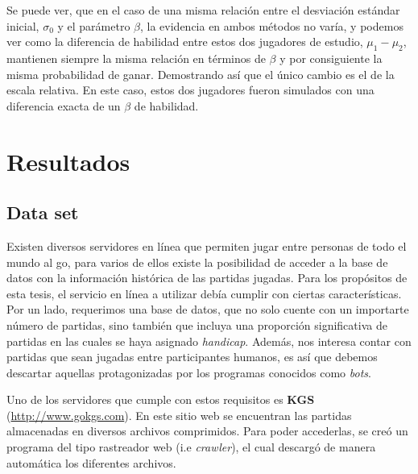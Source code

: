 \documentclass[11pt,twoside,spanish]{report} %
\begin{document}
Se puede ver, que en el caso de una misma relaci\'on entre el desviaci\'on est\'andar inicial, $\sigma_0$ y el par\'ametro $\beta$, la evidencia en ambos m\'etodos  no var\'ia, y podemos ver como la diferencia de habilidad entre estos dos jugadores de estudio,  $\mu_1-\mu_2$, mantienen siempre la misma relaci\'on en t\'erminos de $\beta$ y por consiguiente la misma probabilidad de ganar.
Demostrando as\'i que el \'unico cambio es el de la escala relativa.
En este caso, estos dos jugadores fueron simulados con una diferencia exacta de un $\beta$ de habilidad.











\chapter{Resultados}

\section{Data set}


Existen diversos servidores en l\'inea que permiten jugar entre personas de todo el mundo al go, para varios de ellos existe la posibilidad de acceder a la base de datos con la informaci\'on hist\'orica de las partidas jugadas.
Para los prop\'ositos de esta tesis, el servicio en l\'inea a utilizar deb\'ia cumplir con ciertas caracter\'isticas.
Por un lado, requerimos una base de datos, que no solo cuente con un importarte n\'umero de partidas, sino tambi\'en que incluya una proporci\'on significativa de partidas en las cuales se haya asignado \textit{handicap}.
Adem\'as, nos interesa contar con partidas que sean jugadas entre participantes humanos, es as\'i que debemos descartar aquellas protagonizadas por los programas conocidos como \textit{bots}.

Uno de los servidores que cumple con estos requisitos es \textbf{KGS} (\url{http://www.gokgs.com}).
En este sitio web se encuentran las partidas almacenadas en diversos archivos comprimidos.
Para poder accederlas, se cre\'o un programa del tipo rastreador web (i.e \textit{crawler}), el cual descarg\'o de manera autom\'atica los diferentes archivos.
\end{document}
